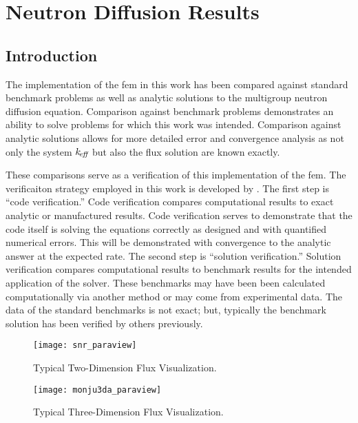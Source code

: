\chapter{Neutron Diffusion Results}
\label{ch:diffusionResults}

\section{Introduction}
  The implementation of the \gls{fem} in this work has been compared
  against standard benchmark problems as well as analytic solutions to the
  multigroup neutron diffusion equation. Comparison against benchmark problems
  demonstrates an ability to solve problems for which this work was intended.
  Comparison against analytic solutions allows for more detailed error and
  convergence analysis as not only the system $k_{\!\mbox{\scriptsize \em eff}}$ but also the flux solution
  are known exactly. 

  These comparisons serve as a verification of this implementation of the
  \gls{fem}. The verificaiton strategy employed in this work is developed by
  \textcite{oberkampf}. The first step is ``code verification.'' Code
  verification compares computational results to exact analytic or manufactured
  results. Code verification serves to demonstrate that the code itself is
  solving the equations correctly as designed and with quantified numerical
  errors. This will be demonstrated with convergence to the analytic answer at
  the expected rate. The second step is ``solution verification.'' Solution
  verification compares computational results to benchmark results for the
  intended application of the solver. These benchmarks may have been been
  calculated computationally via another method or may come from experimental
  data. The data of the standard benchmarks is not exact; but, typically the
  benchmark solution has been verified by others previously.

  \begin{figure}
    \centering
    \texttt{[image: snr\_paraview]}
    \caption{Typical Two-Dimension Flux Visualization.}
    \label{fig:snr_paraview}
  \end{figure}

  \begin{figure}
    \centering
    \texttt{[image: monju3da\_paraview]}
    \caption{Typical Three-Dimension Flux Visualization.}
    \label{fig:monju3da_paraview}
  \end{figure}

